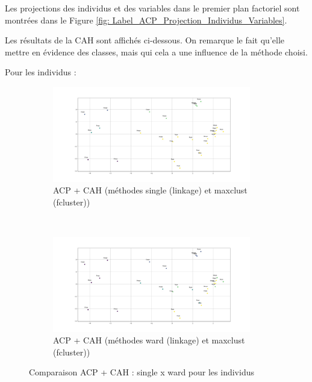     Les projections des individus et des variables dans le premier plan factoriel sont montrées dans le Figure \ref{fig: Label_ACP_Projection_Individus_Variables}. 
    
    Les résultats de la CAH sont affichés ci-dessous. On remarque le fait qu'elle mettre en évidence des classes, mais qui cela a une influence de la méthode choisi.
    
    Pour les individus :
    
    \begin{figure}[!htb]
        \begin{subfigure}[b]{1.0\textwidth}
            \centering
            \includegraphics[width=0.95\textwidth]{img/mixte_acp_cah/Projection_des_individus_dans_le_premier_plan_factoriel_cah_'single'_'maxclust'.jpg}
            \caption{ACP + CAH (méthodes single (linkage) et maxclust (fcluster))}
            \label{Label_Projection_des_individus_dans_le_premier_plan_factoriel_cah_'single'_'maxclust'.jpg}
        \end{subfigure}
        \\
        \begin{subfigure}[b]{1.0\textwidth}
            \centering
            \includegraphics[width=0.95\textwidth]{img/mixte_acp_cah/Projection_des_individus_dans_le_premier_plan_factoriel_cah_'ward'_'maxclust'.jpg}
            \caption{ACP + CAH (méthodes ward (linkage) et maxclust (fcluster))}
            \label{Label_Projection_des_individus_dans_le_premier_plan_factoriel_cah_'ward'_'maxclust'.jpg}
        \end{subfigure}
        \caption{Comparaison ACP + CAH : single x ward pour les individus}
    \end{figure}
    
